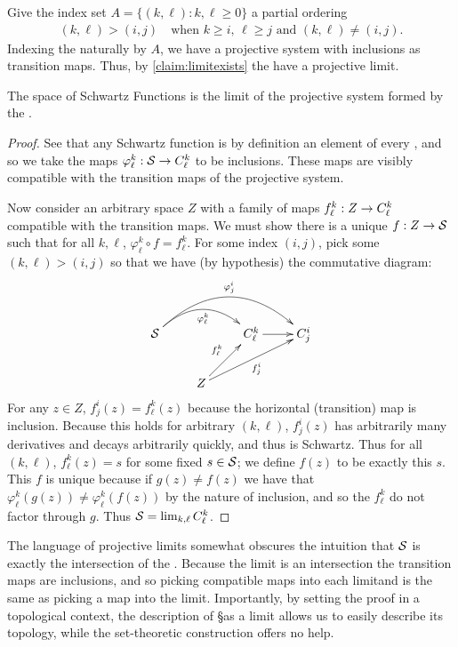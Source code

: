       Give the index set $A=\{(k,\ell):k,\ell\ge0\}$ a partial ordering
      \begin{align*}
        (k,\ell) > (i,j) \quad\text{when $k\ge i$, $\ell\ge j$ and $(k,\ell) \ne (i,j)$.} 
      \end{align*}
      Indexing the \Ckl naturally by $A$, we have a projective system with inclusions as transition maps.
      Thus, by \cref{claim:limitexists} the \Ckl have a projective limit.

      \begin{thm}
        The space of Schwartz Functions is the limit of the projective system formed by the \Ckl.
      \end{thm}
      \begin{proof}
        See that any Schwartz function is by definition an element of every \Ckl, and so we take the maps $\varphi^k_\ell:\S\rightarrow\Ckl$ to be inclusions.
        These maps are visibly compatible with the transition maps of the projective system.

        Now consider an arbitrary space $Z$ with a family of maps $f^k_\ell:Z\rightarrow\Ckl$ compatible with the transition maps.
        We must show there is a unique $f:Z\rightarrow\S$ such that for all $k,\ell$, $\varphi^k_\ell\circ f = f^k_\ell$.
        For some index $(i,j)$, pick some $(k,\ell)>(i,j)$ so that we have (by hypothesis) the commutative diagram:
        \begin{displaymath}
          \xymatrix{
            \S \ar@/^20pt/[rr]_{\varphi^k_\ell} \ar@/^30pt/[rrr]^{\varphi^i_j} && \Ckl \ar[r] & \Cij \\
            & Z \ar[ur]^{f^k_\ell} \ar[urr]_{f^i_j}
          }
        \end{displaymath}
        For any $z\in Z$, $f^i_j(z)=f^k_\ell(z)$ because the horizontal (transition) map is inclusion.
        Because this holds for arbitrary $(k,\ell)$, $f^i_j(z)$ has arbitrarily many derivatives and decays arbitrarily quickly, and thus is Schwartz.
        Thus for all $(k,\ell)$, $f^k_\ell(z)=s$ for some fixed $s\in\S$; we define $f(z)$ to be exactly this $s$.
        This $f$ is unique because if $g(z)\ne f(z)$ we have that $\varphi^k_\ell(g(z))\ne\varphi^k_\ell(f(z))$ by the nature of inclusion, and so the $f^k_\ell$ do not factor through $g$.
        Thus $\S=\lim_{k,\ell}\Ckl$.
      \end{proof}
      \begin{rmk}
        The language of projective limits somewhat obscures the intuition that $\S$ is exactly the intersection of the \Ckl.
        Because the limit is an intersection the transition maps are inclusions, and so picking compatible maps into each limitand is the same as picking a map into the limit.
        Importantly, by setting the proof in a topological context, the description of \S as a limit allows us to easily describe its topology, while the set-theoretic construction offers no help.
      \end{rmk}
